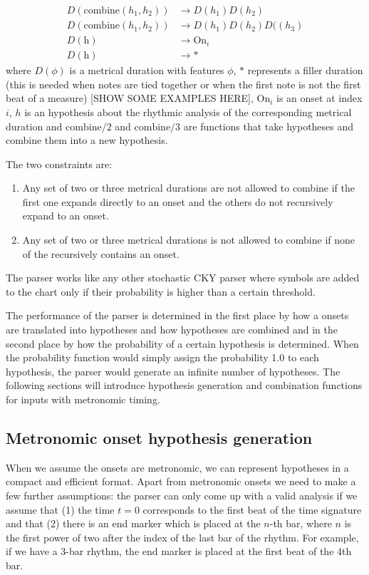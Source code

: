 \documentclass[a4paper,10pt]{article}
\begin{document}
\begin{align*}
\label{eq:rules}
D(\textrm{combine}(h_1, h_2)) &\rightarrow D(h_1) D(h_2)\\
D(\textrm{combine}(h_1, h_2)) &\rightarrow D(h_1) D(h_2) D((h_3)\\
D(\textrm{h}) &\rightarrow \textrm{On}_i\\
D(\textrm{h}) &\rightarrow *
\end{align*}
where $D(\phi)$ is a metrical duration with features $\phi$, $*$ represents a filler duration (this is needed when notes are tied together or when the first note is not the first beat of a measure) [SHOW SOME EXAMPLES HERE], $\textrm{On}_i$ is an onset at index $i$, $h$ is an hypothesis about the rhythmic analysis of the corresponding metrical duration and $\textrm{combine}/2$ and $\textrm{combine}/3$ are functions that take hypotheses and combine them into a new hypothesis.

The two constraints are:
\begin{enumerate}
\item Any set of two or three metrical durations are not allowed to combine if the first one expands directly to an onset and the others do not recursively expand to an onset.
\item Any set of two or three metrical durations is not allowed to combine if none of the recursively contains an onset.
\end{enumerate}

The parser works like any other stochastic CKY parser where symbols are added to the chart only if their probability is higher than a certain threshold.

The performance of the parser is determined in the first place by how a onsets are translated into hypotheses and how hypotheses are combined and in the second place by how the probability of a certain hypothesis is determined. When the probability function would simply assign the probability 1.0 to each hypothesis, the parser would generate an infinite number of hypotheses. The following sections will introduce hypothesis generation and combination functions for inputs with metronomic timing.

\subsection{Metronomic onset hypothesis generation}

When we assume the onsets are metronomic, we can represent hypotheses in a compact and efficient format. Apart from metronomic onsets we need to make a few further assumptions: the parser can only come up with a valid analysis if we assume that (1) the time $t=0$ corresponds to the first beat of the time signature and that (2) there is an end marker which is placed at the $n$-th bar, where $n$ is the first power of two after the index of the last bar of the rhythm. For example, if we have a 3-bar rhythm, the end marker is placed at the first beat of the 4th bar.
\end{document}
